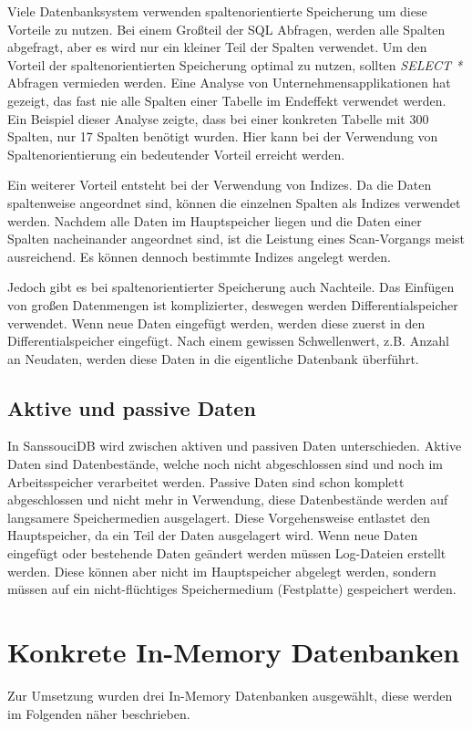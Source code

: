 \documentclass[draft,final]{vutinfth} %
\begin{document}
Viele Datenbanksystem verwenden spaltenorientierte Speicherung um diese Vorteile zu nutzen. Bei einem Gro{\ss}teil der SQL Abfragen, werden alle Spalten abgefragt, aber es wird nur ein kleiner Teil der Spalten verwendet. Um den Vorteil der spaltenorientierten Speicherung optimal zu nutzen, sollten \textit{SELECT *} Abfragen vermieden werden. Eine Analyse von Unternehmensapplikationen hat gezeigt, das fast nie alle Spalten einer Tabelle im Endeffekt verwendet werden. Ein Beispiel dieser Analyse zeigte, dass bei einer konkreten Tabelle mit 300 Spalten, nur 17 Spalten benötigt wurden. Hier kann bei der Verwendung von Spaltenorientierung ein bedeutender Vorteil erreicht werden.

Ein weiterer Vorteil entsteht bei der Verwendung von Indizes. Da die Daten spaltenweise angeordnet sind, können die einzelnen Spalten als Indizes verwendet werden. Nachdem alle Daten im Hauptspeicher liegen und die Daten einer Spalten nacheinander angeordnet sind, ist die Leistung eines Scan-Vorgangs meist ausreichend. Es können dennoch bestimmte Indizes angelegt werden.

Jedoch gibt es bei spaltenorientierter Speicherung auch Nachteile. Das Einfügen von gro\ss en Datenmengen ist komplizierter, deswegen werden Differentialspeicher verwendet. Wenn neue Daten eingefügt werden, werden diese zuerst in den Differentialspeicher eingefügt. Nach einem gewissen Schwellenwert, z.B. Anzahl an Neudaten, werden diese Daten in die eigentliche Datenbank überführt.


\subsection{Aktive und passive Daten}
In SanssouciDB wird zwischen aktiven und passiven Daten unterschieden. Aktive Daten sind Datenbestände, welche noch nicht abgeschlossen sind und noch im Arbeitsspeicher verarbeitet werden. Passive Daten sind schon komplett abgeschlossen und nicht mehr in Verwendung, diese Datenbestände werden auf langsamere Speichermedien ausgelagert. Diese Vorgehensweise entlastet den Hauptspeicher, da ein Teil der Daten ausgelagert wird. Wenn neue Daten eingefügt oder bestehende Daten geändert werden müssen Log-Dateien erstellt werden. Diese können aber nicht im Hauptspeicher abgelegt werden, sondern müssen auf ein nicht-flüchtiges Speichermedium (Festplatte) gespeichert werden.


\section{Konkrete In-Memory Datenbanken}
Zur Umsetzung wurden drei In-Memory Datenbanken ausgewählt, diese werden im Folgenden näher beschrieben.
\end{document}
